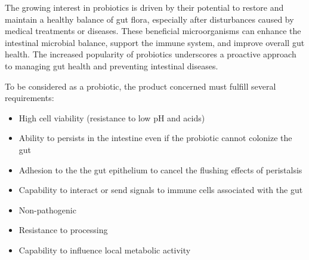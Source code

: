 \documentclass[12pt,twoside]{article}
\begin{document}
The growing interest in probiotics is driven by their potential to restore and maintain a healthy balance of gut flora, especially after disturbances caused by medical treatments or diseases. These beneficial microorganisms can enhance the intestinal microbial balance, support the immune system, and improve overall gut health. The increased popularity of probiotics underscores a proactive approach to managing gut health and preventing intestinal diseases.

To be considered as a probiotic, the product concerned must fulfill several requirements:
\begin{itemize}
    \item     High cell viability (resistance to low pH and acids)
  
    \item   Ability to persists in the intestine even if the probiotic cannot colonize the gut

    \item  Adhesion to the the gut epithelium to cancel the flushing effects of peristalsis

    \item  Capability to interact or send signals to immune cells associated with the gut

    \item  Non-pathogenic

    \item  Resistance to processing

    \item  Capability to influence local metabolic activity
\end{itemize}



\end{document}
